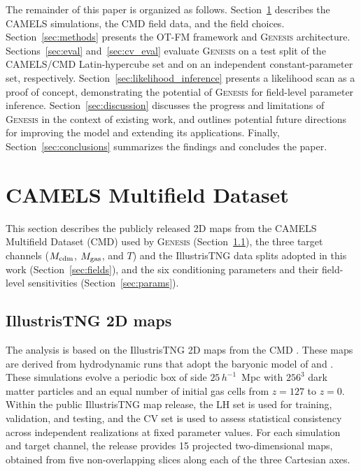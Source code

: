 \documentclass{article}
\newcommand{\Mcdm}{M_{\rm cdm}}
\newcommand{\Mgas}{M_{\rm gas}}
\newcommand{\Tgas}{T}
\begin{document}
The remainder of this paper is organized as follows.
Section~\ref{sec:data} describes the CAMELS simulations, the CMD
field data, and the field choices.
Section~\ref{sec:methods} presents the OT-FM framework and \textsc{Genesis}
architecture.
Sections~\ref{sec:eval} and~\ref{sec:cv_eval} evaluate \textsc{Genesis}
on a test split of the CAMELS/CMD Latin-hypercube set and on an
independent constant-parameter set, respectively.
Section~\ref{sec:likelihood_inference} presents a likelihood scan as a proof of
concept, demonstrating the potential of \textsc{Genesis} for field-level
parameter inference.
Section~\ref{sec:discussion} discusses the progress and limitations of \textsc{Genesis} 
in the context of existing work, and outlines potential future directions for improving the model and extending its applications. 
Finally, Section~\ref{sec:conclusions} summarizes the findings and concludes the paper.

\section{CAMELS Multifield Dataset}
\label{sec:data}
This section describes the publicly released 2D maps from the CAMELS
Multifield Dataset (CMD) used by \textsc{Genesis}
(Section~\ref{sec:camels}), the three target channels
($\Mcdm$, $\Mgas$, and $\Tgas$) and the IllustrisTNG data splits
adopted in this work (Section~\ref{sec:fields}), and the six
conditioning parameters and their field-level sensitivities
(Section~\ref{sec:params}).

\subsection{IllustrisTNG 2D maps}
\label{sec:camels}
The analysis is based on the IllustrisTNG 2D maps from the CMD
\citep{Villaescusa2022}. These maps are derived from hydrodynamic
runs that adopt the baryonic model of \citet{Weinberger2017} and
\citet{Pillepich2018IllustrisTNG}.
These simulations evolve a periodic box of side
$25\,h^{-1}$~Mpc with $256^3$ dark matter particles and an equal
number of initial gas cells from $z=127$ to $z=0$.
Within the public IllustrisTNG map release, the LH set is used for
training, validation, and testing, and the CV set is used to assess
statistical consistency across independent realizations at fixed
parameter values. For each simulation and target channel, the release
provides 15 projected two-dimensional maps, obtained from five
non-overlapping slices along each of the three Cartesian axes.
\end{document}
